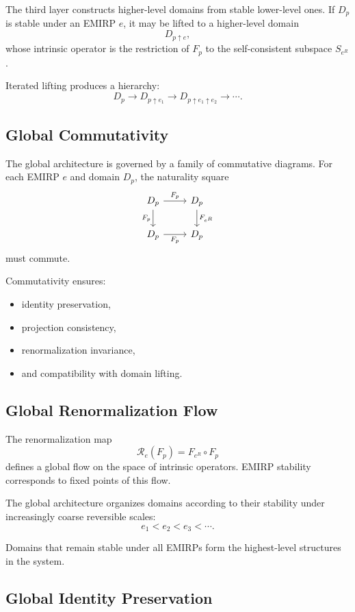\documentclass[11pt]{article}
\theoremstyle{definition}
\theoremstyle{plain}
\theoremstyle{remark}
\begin{document}
The third layer constructs higher-level domains from stable lower-level
ones. If $D_p$ is stable under an EMIRP $e$, it may be lifted to a
higher-level domain
\[
D_{p \uparrow e},
\]
whose intrinsic operator is the restriction of $F_p$ to the
self-consistent subspace $S_{e^R}$.

Iterated lifting produces a hierarchy:
\[
D_p \to D_{p \uparrow e_1} \to D_{p \uparrow e_1 \uparrow e_2} \to \cdots.
\]

\subsection{Global Commutativity}

The global architecture is governed by a family of commutative diagrams.
For each EMIRP $e$ and domain $D_p$, the naturality square
\[
\begin{tikzcd}
D_p \arrow[r,"F_p"] \arrow[d,"F_p"'] &
D_p \arrow[d,"F_{e^R}"] \\
D_p \arrow[r,"F_p"'] &
D_p
\end{tikzcd}
\]
must commute.

Commutativity ensures:
\begin{itemize}
    \item identity preservation,
    \item projection consistency,
    \item renormalization invariance,
    \item and compatibility with domain lifting.
\end{itemize}

\subsection{Global Renormalization Flow}

The renormalization map
\[
\mathcal{R}_e(F_p) = F_{e^R} \circ F_p
\]
defines a global flow on the space of intrinsic operators. EMIRP
stability corresponds to fixed points of this flow.

The global architecture organizes domains according to their stability
under increasingly coarse reversible scales:
\[
e_1 < e_2 < e_3 < \cdots.
\]

Domains that remain stable under all EMIRPs form the highest-level
structures in the system.

\subsection{Global Identity Preservation}
\end{document}
